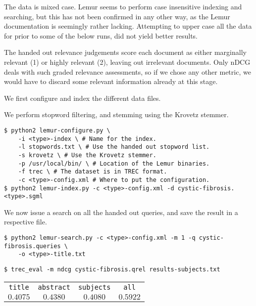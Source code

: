 The data is mixed case. Lemur seems to perform case insensitive indexing and
searching, but this has not been confirmed in any other way, as the Lemur
documentation is seemingly rather lacking. Attempting to upper case all the
data for prior to some of the below runs, did not yield better results.

The handed out relevance judgements score each document as either marginally
relevant (1) or highly relevant (2), leaving out irrelevant documents. Only
nDCG deals with such graded relevance assessments, so if we chose any other
metric, we would have to discard some relevant information already at this
stage.


We first configure and index the
different data files.

We perform stopword filtering, and stemming using the
Krovetz stemmer.

\begin{lstlisting}
$ python2 lemur-configure.py \
    -i <type>-index \ # Name for the index.
    -l stopwords.txt \ # Use the handed out stopword list.
    -s krovetz \ # Use the Krovetz stemmer.
    -p /usr/local/bin/ \ # Location of the Lemur binaries.
    -f trec \ # The dataset is in TREC format.
    -c <type>-config.xml # Where to put the configuration.
$ python2 lemur-index.py -c <type>-config.xml -d cystic-fibrosis.<type>.sgml
\end{lstlisting}

We now issue a search on all the handed out queries, and save the result in a
respective file.

\begin{lstlisting}
$ python2 lemur-search.py -c <type>-config.xml -m 1 -q cystic-fibrosis.queries \
    -o <type>-title.txt
\end{lstlisting}

\begin{lstlisting}
$ trec_eval -m ndcg cystic-fibrosis.qrel results-subjects.txt
\end{lstlisting}

\begin{table}[h!]
\centering
\begin{tabular}{cccc}
\texttt{title} & \texttt{abstract} & \texttt{subjects} & \texttt{all} \\
$0.4075$ & $0.4380$ & $0.4080$ & $0.5922$
\end{tabular}

\end{table}

